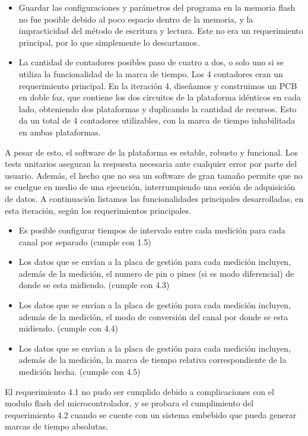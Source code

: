 \begin{itemize}
\item Guardar las configuraciones y parámetros del programa en la memoria flash no fue posible debido al poco espacio dentro de la memoria, y la impracticidad del método de escritura y lectura. Este no era un requerimiento principal, por lo que simplemente lo descartamos.
\item La cantidad de contadores posibles paso de cuatro a dos, o solo uno si se utiliza la funcionalidad de la marca de tiempo. Los 4 contadores eran un requerimiento principal. En la iteración 4, diseñamos y construimos un PCB en doble faz, que contiene los dos circuitos de la plataforma idénticos en cada lado, obteniendo dos plataformas y duplicando la cantidad de recursos. Esto da un total de 4 contadores utilizables, con la marca de tiempo inhabilitada en ambas plataformas. 
\end{itemize}

A pesar de esto, el software de la plataforma es estable, robusto y funcional. Los tests unitarios aseguran la respuesta necesaria ante cualquier error por parte del usuario. Además, el hecho que no sea un software de gran tamaño permite que no se cuelgue en medio de una ejecución, interrumpiendo una sesión de adquisición de datos. A continuación listamos las funcionalidades principales desarrolladas, en esta iteración, según los requerimientos principales.

\begin{itemize}
\item Es posible configurar tiempos de intervalo entre cada medición para cada canal por separado (cumple con 1.5)
\item Los datos que se envían a la placa de gestión para cada medición incluyen, además de la medición, el numero de pin o pines (si es modo diferencial) de donde se esta midiendo. (cumple con 4.3)  
\item Los datos que se envían a la placa de gestión para cada medición incluyen, además de la medición, el modo de conversión del canal por donde se esta midiendo. (cumple con 4.4)
\item Los datos que se envían a la placa de gestión para cada medición incluyen, además de la medición, la marca de tiempo relativa correspondiente de la medición hecha. (cumple con 4.5)
\end{itemize}

El requerimiento 4.1 no pudo ser cumplido debido a complicaciones con el modulo flash del microcontrolador, y se probara el cumplimiento del requerimiento 4.2 cuando se cuente con un sistema embebido que pueda generar marcas de tiempo absolutas.


